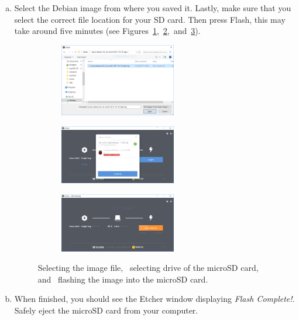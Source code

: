 \begin{enumerate}[a)]
\item Select the Debian image from where you saved it. Lastly, make sure that
  you select the correct file location for your SD card. Then press Flash, this
  may take around five minutes (see
  Figures~\ref{fig:debianImageUpload},~\ref{fig:debianImageUploadSelectDrive},~and~\ref{fig:debianImageUploadSelectDriveFlashing}).
%
\begin{figure}
    \centering
    \begin{subfigure}[b]{\linewidth}
      \centering
      \includegraphics[width=0.6\textwidth]{figs/img/Lab0/debianImageUpload}
      \caption{}
      \label{fig:debianImageUpload}
    \end{subfigure}
    \begin{subfigure}[b]{\linewidth}
      \centering
      \includegraphics[width=0.6\textwidth]{figs/img/Lab0/debianImageUploadSelectDrive}    
      \caption{}
      \label{fig:debianImageUploadSelectDrive}
    \end{subfigure}
    \begin{subfigure}[b]{\linewidth}
      \centering
      \includegraphics[width=0.6\textwidth]{figs/img/Lab0/debianImageUploadSelectDriveFlashing}
      \caption{}
      \label{fig:debianImageUploadSelectDriveFlashing}
    \end{subfigure}
    \caption{ Selecting the image file,~ selecting drive of the microSD card, and~ flashing the image into the microSD card.}
    \label{fig:debianImageUpload2-MicroSD}
\end{figure}
%


\item When finished, you should see the Etcher window displaying \emph{Flash Complete!}. Safely eject the microSD card from your computer.
\end{enumerate}


